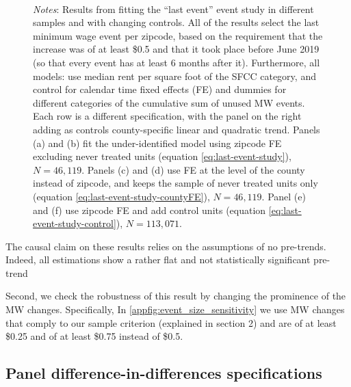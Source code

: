 \begin{figure}[h!]
\begin{subfigure}{0.5\textwidth}
        \end{subfigure}\\
        \begin{minipage}{.95\textwidth} \footnotesize
			\vspace{2mm} 
			\textit{Notes}: Results from fitting the ``last event'' event study in different samples and with changing controls. All of the results select the last minimum wage event per zipcode, based on the requirement that the increase was of at least \$0.5 and that it took place before June 2019 (so that every event has at least 6 months after it). Furthermore, all models: use median rent per square foot of the SFCC category, and control for calendar time fixed effects (FE) and dummies for different categories of the cumulative sum of unused MW events. Each row is a different specification, with the panel on the right adding as controls county-specific linear and quadratic trend. Panels (a) and (b) fit the under-identified model using zipcode FE excluding never treated units (equation \ref{eq:last-event-study}), $N = 46,119$. Panels (c) and (d) use FE at the level of the county instead of zipcode, and keeps the sample of never treated units only (equation \ref{eq:last-event-study-countyFE}), $N = 46,119$. Panel (e) and (f) use zipcode FE and add control units (equation \ref{eq:last-event-study-control}), $N = 113,071$.
		\end{minipage}
    \end{figure}
    
    The causal claim on these results relies on the assumptions of no pre-trends. Indeed, all estimations show a rather flat and not statistically significant pre-trend %
    
    
    
    Second, we check the robustness of this result by changing the prominence of the MW changes. Specifically, In \ref{appfig:event_size_sensitivity} we use MW changes that comply to our sample criterion (explained in section 2) and are of at least \$0.25 and of at least \$0.75 instead of \$0.5.
    
    
    
\subsection{Panel difference-in-differences specifications}\label{subsec:results/first-differences}

